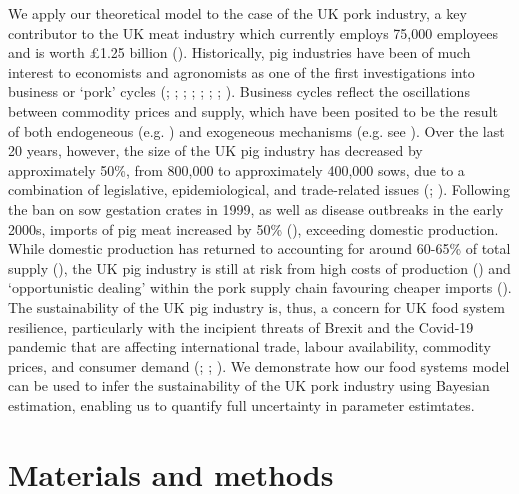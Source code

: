 \documentclass[12pt]{article}
\begin{document}
We apply our theoretical model to the case of the UK pork industry, a key contributor to the UK meat industry which currently employs 75,000 employees and is worth \pounds1.25 billion (\cite{DEFRA2019auk18}). Historically, pig industries have been of much interest to economists and agronomists as one of the first investigations into business or `pork' cycles (\cite{haldane1934}; \cite{coase1935}; \cite{ezekiel1938}; \cite{harlow1960}; \cite{meadows1971}; \cite{zawadzka2010}; \cite{parker2014}; \cite{sterman2000}). Business cycles reflect the oscillations between commodity prices and supply, which have been posited to be the result of both endogeneous (e.g. \cite{nerlove1958}) and exogeneous mechanisms (e.g. see \cite{gouel2012}). Over the last 20 years, however, the size of the UK pig industry has decreased by approximately 50\%, from 800,000 to approximately 400,000 sows, due to a combination of legislative, epidemiological, and trade-related issues (\cite{taylor2006}; \cite{dawson2009}). Following the ban on sow gestation crates in 1999, as well as disease outbreaks in the early 2000s, imports of pig meat increased by 50\% (\cite{DEFRApigcattlestats2020}), exceeding domestic production. While domestic production has returned to accounting for around 60-65\% of total supply (\cite{DEFRApigcattlestats2020}), the UK pig industry is still at risk from high costs of production (\cite{BPEXprofitability2011}) and `opportunistic dealing' within the pork supply chain favouring cheaper imports (\cite{bowman2013}). The sustainability of the UK pig industry is, thus, a concern for UK food system resilience, particularly with the incipient threats of Brexit and the Covid-19 pandemic that are affecting international trade, labour availability, commodity prices, and consumer demand (\cite{power2020}; \cite{feng2017}; \cite{poppy2019}). We demonstrate how our food systems model can be used to infer the sustainability of the UK pork industry using Bayesian estimation, enabling us to quantify full uncertainty in parameter estimtates.

\section{Materials and methods}
\end{document}
